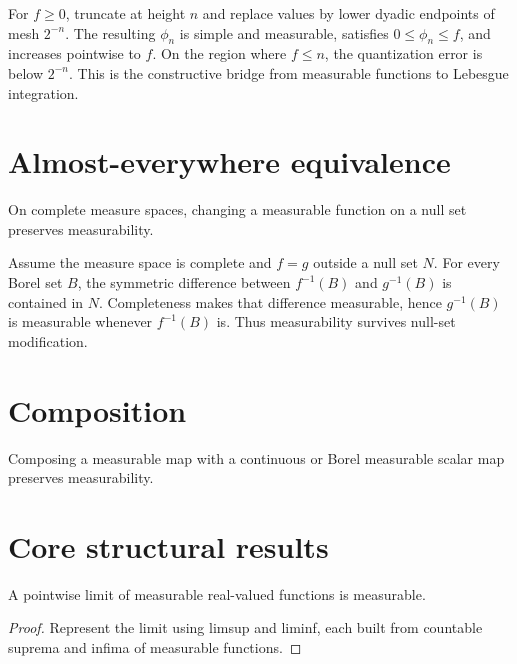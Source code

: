\begin{example}\label{ex:iii02-expand-02}
For \(f\ge0\), truncate at height \(n\) and replace values by lower dyadic
endpoints of mesh \(2^{-n}\). The resulting \(\phi_n\) is simple and measurable,
satisfies \(0\le\phi_n\le f\), and increases pointwise to \(f\). On the region
where \(f\le n\), the quantization error is below \(2^{-n}\). This is the
constructive bridge from measurable functions to Lebesgue integration.
\end{example}
\section{Almost-everywhere equivalence}
On complete measure spaces, changing a measurable function on a null set preserves measurability.


\begin{example}\label{ex:iii02-expand-03}
Assume the measure space is complete and \(f=g\) outside a null set \(N\).
For every Borel set \(B\), the symmetric difference between
\(f^{-1}(B)\) and \(g^{-1}(B)\) is contained in \(N\). Completeness makes that
difference measurable, hence \(g^{-1}(B)\) is measurable whenever
\(f^{-1}(B)\) is. Thus measurability survives null-set modification.
\end{example}
\section{Composition}
Composing a measurable map with a continuous or Borel measurable scalar map preserves measurability.

\section{Core structural results}

\begin{theorem}\label{thm:iii02-01}
A pointwise limit of measurable real-valued functions is measurable.
\begin{proof}
Represent the limit using limsup and liminf, each built from countable suprema and infima of measurable functions.
\end{proof}
\end{theorem}


